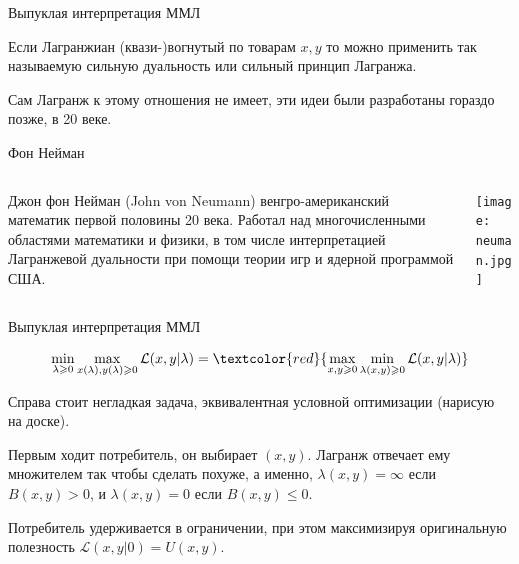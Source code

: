 \documentclass{beamer}
\begin{document}
\begin{frame}{Выпуклая интерпретация ММЛ}

Если Лагранжиан (квази-)вогнутый по товарам $x,y$ то можно применить  так называемую \alert{сильную дуальность} или \alert{сильный принцип Лагранжа}.

Сам Лагранж к этому отношения не имеет, эти идеи были разработаны гораздо позже, в 20 веке.
\end{frame}

\begin{frame}{Фон Нейман}

\begin{columns}
\begin{column}{0.5\textwidth}
   \alert{Джон фон Нейман} (John von Neumann) венгро-американский математик первой половины 20 века. Работал над многочисленными областями математики и физики, в том числе \alert{интерпретацией Лагранжевой дуальности при помощи теории игр} и ядерной программой США.
\end{column}
\begin{column}{0.5\textwidth}  %
    \begin{center}
     \texttt{[image: neuman.jpg]}
     \end{center}
\end{column}
\end{columns}

\end{frame}

\begin{frame}{Выпуклая интерпретация ММЛ}

$$ \min_{\lambda \geqslant 0} \max_{x(\lambda),y(\lambda) \geqslant 0} \mathcal{L}(x,y | \lambda) = \textcolor{red}{\max_{x,y \geqslant 0} \min_{\lambda(x,y) \geqslant 0} \mathcal{L}(x,y | \lambda)} $$ 

Справа стоит негладкая задача, эквивалентная условной оптимизации (нарисую на доске).

Первым ходит потребитель, он выбирает $(x,y)$. Лагранж отвечает ему множителем так чтобы сделать похуже, а именно, $\lambda(x,y) = \infty$ если $B(x,y) > 0$, и $\lambda(x,y) = 0$ если $B(x,y) \leqslant 0$. 

Потребитель удерживается в ограничении, при этом максимизируя оригинальную полезность $\mathcal{L}(x,y | 0) = U(x,y)$.

\end{frame}
\end{document}
